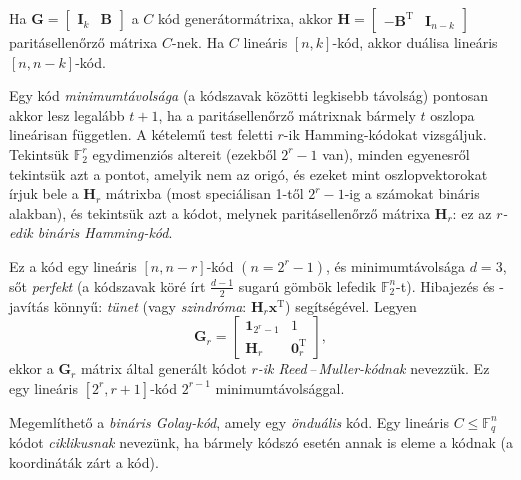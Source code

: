 \documentclass[DIV=15,appendixprefix]{scrreprt}
\theoremstyle{definition}
\theoremstyle{remark}
\DeclareMathOperator{\T}{T}
\begin{document}
Ha $ \mathbf{ G } = \begin{bmatrix} \mathbf{ I }_{ k } & \mathbf{ B } \end{bmatrix} $ a $ C $ kód
generátormátrixa, akkor $ \mathbf{ H } = \begin{bmatrix} - \mathbf{ B }^{ \T } &
\mathbf{ I }_{ n - k } \end{bmatrix} $ paritásellenőrző mátrixa $ C $-nek. Ha $ C $ lineáris
$ \left[ n,{} k \right] $-kód, akkor duálisa lineáris $ \left[ n,{} n - k \right] $-kód.

Egy kód \emph{minimumtávolsága} (a kódszavak közötti legkisebb távolság) pontosan akkor lesz
legalább $ t + 1 $, ha a paritásellenőrző mátrixnak bármely $ t $ oszlopa lineárisan független.
%
A kételemű test feletti $ r $-ik Hamming-kódokat vizsgáljuk. Tekintsük $ \mathbb{ F }_{ 2 }^{ r } $
egydimenziós altereit (ezekből $ 2^{ r } - 1 $ van), minden egyenesről tekintsük azt a pontot,
amelyik nem az origó, és ezeket mint oszlopvektorokat írjuk bele a $ \mathbf{ H }_{ r } $ mátrixba
(most speciálisan 1-től $ 2^{ r } - 1 $-ig a számokat bináris alakban), és tekintsük azt a kódot,
melynek paritásellenőrző mátrixa $ \mathbf{ H }_{ r } $: ez az \emph{$ r $-edik bináris
Hamming-kód}.

Ez a kód egy lineáris $ \left[ n,{} n - r  \right] $-kód $ \left( n = 2^{ r } - 1 \right) $, és
minimumtávolsága $ d = 3 $, sőt \emph{perfekt} (a
kódszavak köré írt $ \frac{ d - 1 }{ 2 } $ sugarú gömbök lefedik $ \mathbb{ F }_{ 2 }^{ n } $-t).
Hibajezés és -javítás könnyű: \emph{tünet} (vagy \emph{szindróma}: $ \mathbf{ H }_{ r }
\mathbf{ x }^{ \T } $)
segítségével.
%
Legyen
\begin{equation*}
	\mathbf{ G }_{ r } = \begin{bmatrix}
		\mathbf{ 1 }_{ 2^{ r } - 1 }	&	1\\
		\mathbf{ H }_{ r }				&	\mathbf{ 0 }_{ r }^{ \T }
	\end{bmatrix},
\end{equation*}
ekkor a $ \mathbf{ G }_{ r } $ mátrix által generált kódot \emph{$ r $-ik Reed\,--\,Muller-kódnak}
nevezzük. Ez egy lineáris $ \left[ 2^{ r },{} r + 1 \right] $-kód $ 2^{ r  - 1 } $
minimumtávolsággal.

Megemlíthető a \emph{bináris Golay-kód}, amely egy \emph{önduális} kód.
%
Egy lineáris $ C \le \mathbb{ F }_{ q }^{ n } $ kódot \emph{ciklikusnak} nevezünk, ha bármely
kódszó esetén annak  is eleme a kódnak (a koordináták
 zárt a kód).
\end{document}
